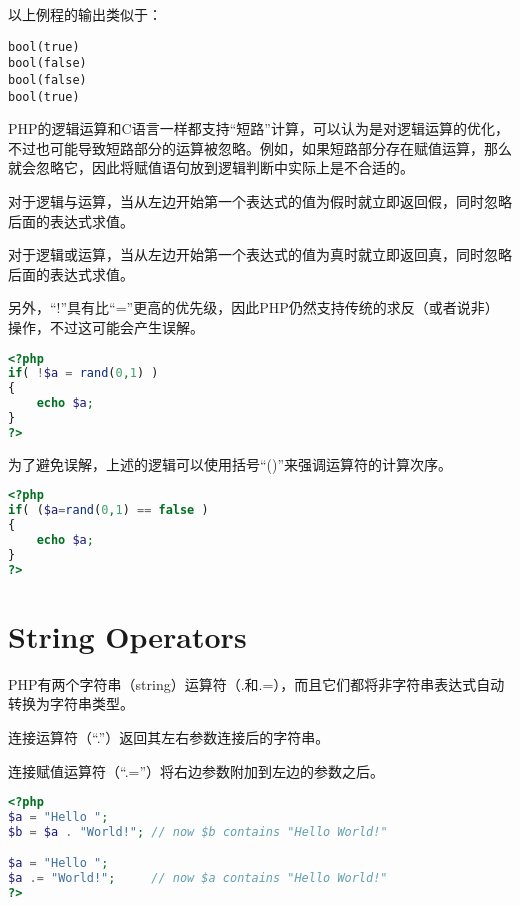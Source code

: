 以上例程的输出类似于：

\begin{verbatim}
bool(true)
bool(false)
bool(false)
bool(true)
\end{verbatim}

PHP的逻辑运算和C语言一样都支持“短路”计算，可以认为是对逻辑运算的优化，不过也可能导致短路部分的运算被忽略。例如，如果短路部分存在赋值运算，那么就会忽略它，因此将赋值语句放到逻辑判断中实际上是不合适的。



\begin{compactitem}
\item 对于逻辑与运算，当从左边开始第一个表达式的值为假时就立即返回假，同时忽略后面的表达式求值。
\item 对于逻辑或运算，当从左边开始第一个表达式的值为真时就立即返回真，同时忽略后面的表达式求值。
\end{compactitem}

另外，“!”具有比“=”更高的优先级，因此PHP仍然支持传统的求反（或者说非）操作，不过这可能会产生误解。

\begin{lstlisting}[language=PHP]
<?php
if( !$a = rand(0,1) )
{
	echo $a;
}
?>
\end{lstlisting}

为了避免误解，上述的逻辑可以使用括号“()”来强调运算符的计算次序。

\begin{lstlisting}[language=PHP]
<?php
if( ($a=rand(0,1) == false )
{
	echo $a;
}
?>
\end{lstlisting}


\section{String Operators}


PHP有两个字符串（string）运算符（.和.=），而且它们都将非字符串表达式自动转换为字符串类型。

\begin{compactitem}
\item 连接运算符（“.”）返回其左右参数连接后的字符串。
\item 连接赋值运算符（“.=”）将右边参数附加到左边的参数之后。
\end{compactitem}

\begin{lstlisting}[language=PHP]
<?php
$a = "Hello ";
$b = $a . "World!"; // now $b contains "Hello World!"

$a = "Hello ";
$a .= "World!";     // now $a contains "Hello World!"
?>
\end{lstlisting}

